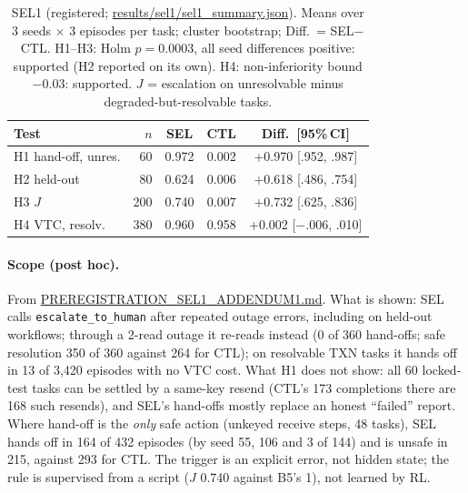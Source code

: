\documentclass[11pt]{article}
\newcommand{\code}[1]{\texttt{\small #1}}
\begin{document}
\begin{table}[t]
\centering\footnotesize
\setlength{\tabcolsep}{2.2pt}
\begin{tabular}{@{}lrccc@{}}
\toprule
Test & $n$ & SEL & CTL & Diff.\ [95\%\,CI] \\
\midrule
H1 hand-off, unres. & 60 & 0.972 & 0.002 & +0.970 [.952, .987] \\
H2 held-out & 80 & 0.624 & 0.006 & +0.618 [.486, .754] \\
H3 $J$ & 200 & 0.740 & 0.007 & +0.732 [.625, .836] \\
H4 VTC, resolv. & 380 & 0.960 & 0.958 & +0.002 [$-$.006, .010] \\
\bottomrule
\end{tabular}
\caption{SEL1 (registered; \url{results/sel1/sel1_summary.json}). Means over 3 seeds $\times$ 3 episodes per task;
cluster bootstrap; Diff.\ = SEL$-$CTL. H1--H3: Holm $p=0.0003$, all seed differences positive: supported (H2 reported on its own).
H4: non-inferiority bound $-0.03$: supported. $J$ = escalation on unresolvable minus degraded-but-resolvable tasks.}
\label{tab:sel1}
\end{table}

\paragraph{Scope (post hoc).} From \url{PREREGISTRATION_SEL1_ADDENDUM1.md}. What is shown: SEL calls
\code{escalate\_to\_human} after repeated outage errors, including on held-out workflows; through a 2-read outage it
re-reads instead (0 of 360 hand-offs; safe resolution 350 of 360 against 264 for CTL); on resolvable TXN tasks it
hands off in 13 of 3{,}420 episodes with no VTC cost. What H1 does not show: all 60 locked-test tasks can be settled by
a same-key resend (CTL's 173 completions there are 168 such resends), and SEL's hand-offs mostly replace an honest
``failed'' report. Where hand-off is the \emph{only} safe action (unkeyed receive steps, 48 tasks), SEL hands off in
164 of 432 episodes (by seed 55, 106 and 3 of 144) and is unsafe in 215, against 293 for CTL. The trigger is an
explicit error, not hidden state; the rule is supervised from a script ($J$ 0.740 against B5's 1), not learned by RL.
\end{document}
